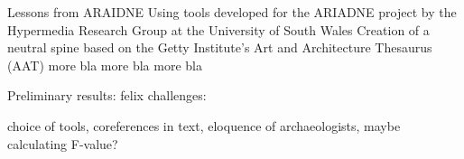 \documentclass[xcolor=x11names, aspectratio=169,usenames,dvipsnames]{beamer}
\begin{document}
\begin{frame}{Lessons from ARAIDNE}
Using tools developed for the ARIADNE project by the Hypermedia Research Group at the University of South Wales \hfill{}\newline
Creation of a neutral spine based on the Getty Institute's Art and Architecture Thesaurus (AAT)\newline
more bla\newline
more bla\newline
more bla\newline
\end{frame}

\begin{frame}{Preliminary results: felix}
challenges:

choice of tools, coreferences in text, eloquence of archaeologists, maybe calculating F-value?
\end{frame}

\maketitle
\end{document}

